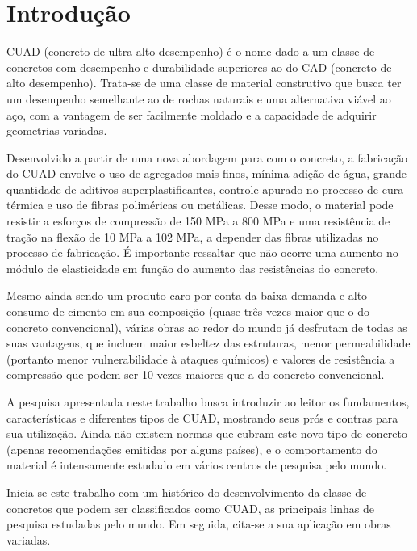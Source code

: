 \documentclass[
	12pt,				%
	openright,			%
	twoside,			%
	a4paper,			%
	english,			%
	french,				%
	spanish,			%
	brazil				%
	]{abntex2}
\begin{document}
\chapter*[Introdução]{Introdução}

CUAD (concreto de ultra alto desempenho) é o nome dado a um classe de concretos com desempenho e durabilidade superiores ao do CAD (concreto de alto desempenho). Trata-se de uma classe de material construtivo que busca ter um desempenho semelhante ao de rochas naturais e uma alternativa viável ao aço, com a vantagem de ser facilmente moldado e a capacidade de adquirir geometrias variadas.

Desenvolvido a partir de uma nova abordagem para com o concreto, a fabricação do CUAD envolve o uso de agregados mais finos, mínima adição de água, grande quantidade de aditivos superplastificantes, controle apurado no processo de cura térmica e uso de fibras poliméricas ou metálicas. Desse modo, o material pode resistir a esforços de compressão de 150 MPa a 800 MPa e uma resistência de tração na flexão de 10 MPa a 102 MPa, a depender das fibras utilizadas no processo de fabricação. É importante ressaltar que não ocorre uma  aumento no módulo de elasticidade em função do aumento das resistências do concreto.

Mesmo ainda sendo um produto caro por conta da baixa demanda e alto consumo de cimento em sua composição (quase três vezes maior que o do concreto convencional), várias obras ao redor do mundo já desfrutam de todas as suas vantagens, que incluem maior esbeltez das estruturas, menor permeabilidade (portanto menor vulnerabilidade à ataques químicos) e valores de resistência a compressão que podem ser 10 vezes maiores que a do concreto convencional.

A pesquisa apresentada neste trabalho busca introduzir ao leitor os fundamentos, características e diferentes tipos de CUAD, mostrando seus prós e contras para sua utilização. Ainda não existem normas que cubram este novo tipo de concreto (apenas recomendações emitidas por alguns países), e o comportamento do material é intensamente estudado em vários centros de pesquisa pelo mundo.

Inicia-se este trabalho com um histórico do desenvolvimento da classe de concretos que podem ser classificados como CUAD, as principais linhas de pesquisa estudadas pelo mundo. Em seguida, cita-se a sua aplicação em obras variadas.
\end{document}

